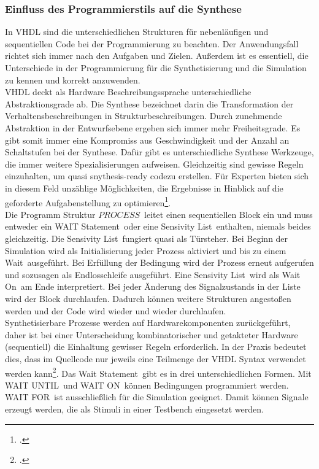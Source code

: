 \documentclass[12pt,a4paper]{scrartcl}	%
\begin{document}
\subsubsection{Einfluss des Programmierstils auf die Synthese}
In VHDL sind die unterschiedlichen Strukturen für nebenläufigen und sequentiellen Code bei der Programmierung zu beachten. Der Anwendungsfall richtet sich immer nach den Aufgaben und Zielen. Außerdem ist es essentiell, die Unterschiede in der Programmierung für die Synthetisierung und die Simulation zu kennen und korrekt anzuwenden.\\
VHDL deckt als Hardware Beschreibungssprache unterschiedliche Abstraktionsgrade ab. Die Synthese bezeichnet darin die Transformation der Verhaltensbeschreibungen in Strukturbeschreibungen. Durch zunehmende Abstraktion in der Entwurfsebene ergeben sich immer mehr Freiheitsgrade. Es gibt somit immer eine Kompromiss aus Geschwindigkeit und der Anzahl an Schaltstufen bei der Synthese. Dafür gibt es unterschiedliche Synthese Werkzeuge, die immer weitere Spezialisierungen aufweisen. Gleichzeitig sind gewisse Regeln einzuhalten, um quasi \glqq snythesis-ready code\grqq zu erstellen. Für Experten bieten sich in diesem Feld unzählige Möglichkeiten, die Ergebnisse in Hinblick auf die geforderte Aufgabenstellung zu optimieren\footcite[vgl.][Abruf am 15.11.2017]{V}.\\
Die Programm Struktur $PROCESS$~leitet einen sequentiellen Block ein und muss entweder ein \glqq WAIT Statement\grqq~oder eine \glqq Sensivity List\grqq~enthalten, niemals beides gleichzeitig. Die \glqq Sensivity List\grqq~fungiert quasi als Türsteher. Bei Beginn der Simulation wird als Initialisierung jeder Prozess aktiviert und bis zu einem \glqq Wait\grqq~ausgeführt. Bei Erfüllung der Bedingung wird der Prozess erneut aufgerufen und sozusagen als Endlosschleife ausgeführt. Eine \glqq Sensivity List\grqq~wird als \glqq Wait On\grqq~am Ende interpretiert. Bei jeder Änderung des Signalzustands in der Liste wird der Block durchlaufen. Dadurch können weitere Strukturen angestoßen werden und der Code wird wieder und wieder durchlaufen.\\
Synthetisierbare Prozesse werden auf Hardwarekomponenten zurückgeführt, daher ist bei einer Unterscheidung kombinatorischer und getakteter Hardware (sequentiell) die Einhaltung gewisser Regeln erforderlich. In der Praxis bedeutet dies, dass im Quellcode nur jeweils eine Teilmenge der VHDL Syntax verwendet werden kann\footcite[vgl.][S. 34 f.]{pro}. Das \glqq Wait Statement\grqq~gibt es in drei unterschiedlichen Formen. Mit \glqq WAIT UNTIL\grqq~und \glqq WAIT ON\grqq~können Bedingungen programmiert werden. \glqq WAIT FOR\grqq~ist ausschließlich für die Simulation geeignet. Damit können Signale erzeugt werden, die als Stimuli in einer Testbench eingesetzt werden.\\
\end{document}
